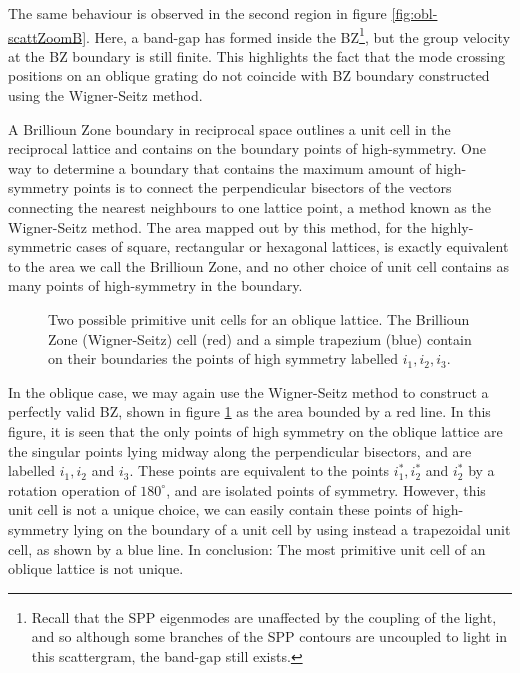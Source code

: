 The same behaviour is observed in the second region in figure \ref{fig:obl-scattZoomB}. Here, a band-gap has formed inside the BZ\footnote{Recall that the SPP eigenmodes are unaffected by the coupling of the light, and so although some branches of the SPP contours are uncoupled to light in this scattergram, the band-gap still exists.}, but the group velocity at the BZ boundary is still finite. This highlights the fact that the mode crossing positions on an oblique grating do not coincide with BZ boundary constructed using the Wigner-Seitz method. 

A Brillioun Zone boundary in reciprocal space outlines a unit cell in the reciprocal lattice and contains on the boundary points of high-symmetry. One way to determine a boundary that contains the maximum amount of high-symmetry points is to connect the perpendicular bisectors of the vectors connecting the nearest neighbours to one lattice point, a method known as the Wigner-Seitz method. The area mapped out by this method, for the highly-symmetric cases of square, rectangular or hexagonal lattices, is exactly equivalent to the area we call the Brillioun Zone, and no other choice of unit cell contains as many points of high-symmetry in the boundary.

\begin{figure}
\centering 
\caption[Two possible primitive unit cells for an oblique lattice.]{Two possible primitive unit cells for an oblique lattice. The Brillioun Zone (Wigner-Seitz) cell (\color{red}red\color{black}) and a simple trapezium (\color{blue}blue\color{black}) contain on their boundaries the points of high symmetry labelled $i_1,i_2,i_3$.\label{fig:highsysmpoints-oblique}}
\end{figure}

In the oblique case, we may again use the Wigner-Seitz method to construct a perfectly valid BZ, shown in figure \ref{fig:highsysmpoints-oblique} as the area bounded by a red line. In this figure, it is seen that the only points of high symmetry on the oblique lattice are the singular points lying midway along the perpendicular bisectors, and are labelled $i_1,i_2$ and $i_3$. These points are equivalent to the points $i_1^*,i_2^*$ and $i_2^*$ by a rotation operation of $180^\circ$, and are isolated points of symmetry.  However, this unit cell is not a unique choice, we can easily contain these points of high-symmetry lying on the boundary of a unit cell by using instead a trapezoidal unit cell, as shown by a blue line. In conclusion: The most primitive unit cell of an oblique lattice is not unique. 

